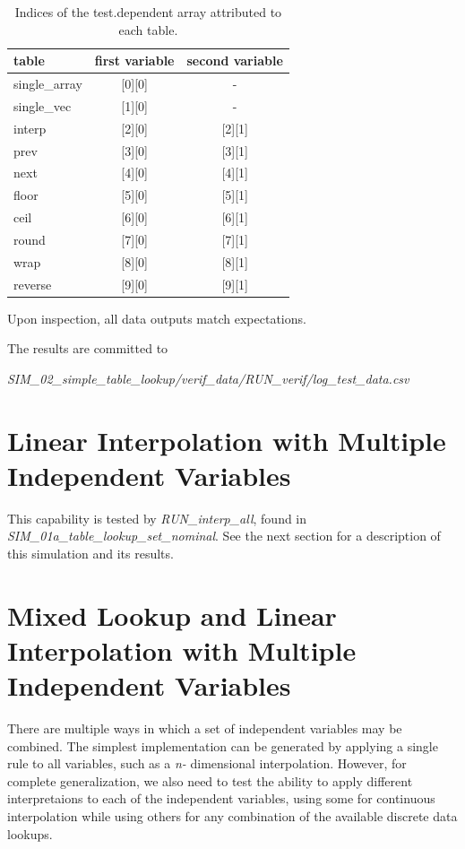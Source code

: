 \documentclass[11pt,fleqn]{report}
\begin{document}
\begin{table}[ht]
\caption{Indices of the test.dependent array attributed to each table.}
\begin{center}
\begin{tabular}{|l|c|c|}
\hline
\textbf{table} &
\textbf{first variable} &
\textbf{second variable} \\
\hline


single\_array & [0][0]  & -      \\
single\_vec   & [1][0]  & -      \\
interp        & [2][0]  & [2][1] \\
prev          & [3][0]  & [3][1] \\
next          & [4][0]  & [4][1] \\
floor         & [5][0]  & [5][1] \\
ceil          & [6][0]  & [6][1] \\
round         & [7][0]  & [7][1] \\
wrap          & [8][0]  & [8][1] \\
reverse       & [9][0]  & [9][1] \\
\hline
\end{tabular}
\end{center}
\end{table}

Upon inspection, all data outputs match expectations.

The results are committed to

\textit{SIM\_02\_simple\_table\_lookup/verif\_data/RUN\_verif/log\_test\_data.csv}



\section{ Linear Interpolation with Multiple Independent Variables}
This capability is tested by \textit{RUN\_interp\_all}, found in
\textit{SIM\_01a\_table\_lookup\_set\_nominal}. See the next section for a
description of this simulation and its results.

\section{ Mixed Lookup and Linear Interpolation with Multiple Independent
Variables}

There are multiple ways in which a set of independent variables may be
combined.  The simplest implementation can be generated by applying a single
rule to all variables, such as a \textit{n-} dimensional interpolation.
However, for complete generalization, we also need to test the
ability to apply different interpretaions to each of the independent
variables, using some for continuous interpolation while
using others for any combination of the available discrete data lookups.
\end{document}
